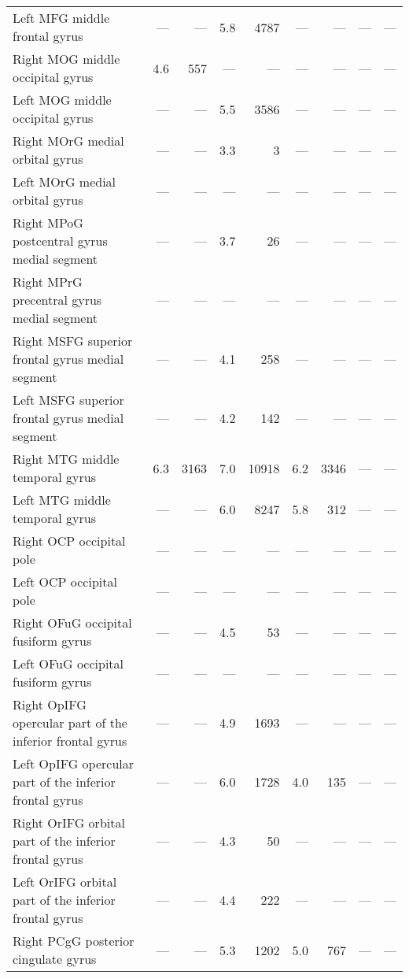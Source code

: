 \documentclass[]{article}
\begin{document}
\begin{table}[ht]
{\begin{tabular}{lrrrrrrrr}
  Left MFG   middle frontal gyrus & --- & --- & 5.8 & 4787 & --- & --- & --- & --- \\ 
  Right MOG   middle occipital gyrus & 4.6 & 557 & --- & --- & --- & --- & --- & --- \\ 
  Left MOG   middle occipital gyrus & --- & --- & 5.5 & 3586 & --- & --- & --- & --- \\ 
  Right MOrG  medial orbital gyrus & --- & --- & 3.3 & 3 & --- & --- & --- & --- \\ 
  Left MOrG  medial orbital gyrus & --- & --- & --- & --- & --- & --- & --- & --- \\ 
  Right MPoG  postcentral gyrus medial segment & --- & --- & 3.7 & 26 & --- & --- & --- & --- \\ 
  Right MPrG  precentral gyrus medial segment & --- & --- & --- & --- & --- & --- & --- & --- \\ 
  Right MSFG  superior frontal gyrus medial segment & --- & --- & 4.1 & 258 & --- & --- & --- & --- \\ 
  Left MSFG  superior frontal gyrus medial segment & --- & --- & 4.2 & 142 & --- & --- & --- & --- \\ 
  Right MTG   middle temporal gyrus & 6.3 & 3163 & 7.0 & 10918 & 6.2 & 3346 & --- & --- \\ 
  Left MTG   middle temporal gyrus & --- & --- & 6.0 & 8247 & 5.8 & 312 & --- & --- \\ 
  Right OCP   occipital pole & --- & --- & --- & --- & --- & --- & --- & --- \\ 
  Left OCP   occipital pole & --- & --- & --- & --- & --- & --- & --- & --- \\ 
  Right OFuG  occipital fusiform gyrus & --- & --- & 4.5 & 53 & --- & --- & --- & --- \\ 
  Left OFuG  occipital fusiform gyrus & --- & --- & --- & --- & --- & --- & --- & --- \\ 
  Right OpIFG opercular part of the inferior frontal gyrus & --- & --- & 4.9 & 1693 & --- & --- & --- & --- \\ 
  Left OpIFG opercular part of the inferior frontal gyrus & --- & --- & 6.0 & 1728 & 4.0 & 135 & --- & --- \\ 
  Right OrIFG orbital part of the inferior frontal gyrus & --- & --- & 4.3 & 50 & --- & --- & --- & --- \\ 
  Left OrIFG orbital part of the inferior frontal gyrus & --- & --- & 4.4 & 222 & --- & --- & --- & --- \\ 
  Right PCgG  posterior cingulate gyrus & --- & --- & 5.3 & 1202 & 5.0 & 767 & --- & --- \\ 

\end{tabular}}
\end{table}
\end{document}
